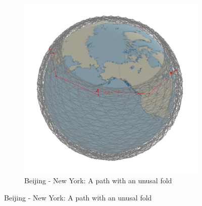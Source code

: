 \documentclass[12pt]{report}
\begin{document}
\begin{figure}
	\begin{subfigure}[b]{\textwidth}
		\caption{Beijing - New York: A path with an unusal fold}
		\includegraphics[width=\textwidth]{NY-BJ-DistL-1}
	\end{subfigure}
\end{figure}
\end{document}
